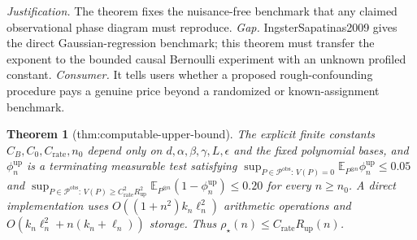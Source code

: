 \documentclass{article}
\newtheorem{theorem}{Theorem}
\begin{document}
\par\smallskip\noindent \textit{Justification.} The theorem fixes the nuisance-free benchmark that any claimed observational phase diagram must reproduce. \textit{Gap.} IngsterSapatinas2009 gives the direct Gaussian-regression benchmark; this theorem must transfer the exponent to the bounded causal Bernoulli experiment with an unknown profiled constant. \textit{Consumer.} It tells users whether a proposed rough-confounding procedure pays a genuine price beyond a randomized or known-assignment benchmark.

\begin{theorem}[thm:computable-upper-bound]\label{thm:computable-upper-bound}
The explicit finite constants \(C_B,C_0,C_{\mathrm{rate}},n_0\) depend only on \(d,\alpha,\beta,\gamma,L,\epsilon\) and the fixed polynomial bases, and \(\phi_n^{\mathrm{up}}\) is a terminating measurable test satisfying \(\sup_{P\in\mathcal P^{\mathrm{obs}}:\,V(P)=0}\mathbb E_{P^{\otimes n}}\phi_n^{\mathrm{up}}\le0.05\) and \(\sup_{P\in\mathcal P^{\mathrm{obs}}:\,V(P)\ge C_{\mathrm{rate}}^2R_{\mathrm{up}}^2}\mathbb E_{P^{\otimes n}}(1-\phi_n^{\mathrm{up}})\le0.20\) for every \(n\ge n_0\). A direct implementation uses \(O((1+n^2)k_n\ell_n^2)\) arithmetic operations and \(O(k_n\ell_n^2+n(k_n+\ell_n))\) storage. Thus \(\rho_\star(n)\le C_{\mathrm{rate}}R_{\mathrm{up}}(n)\).
\end{theorem}
\end{document}
